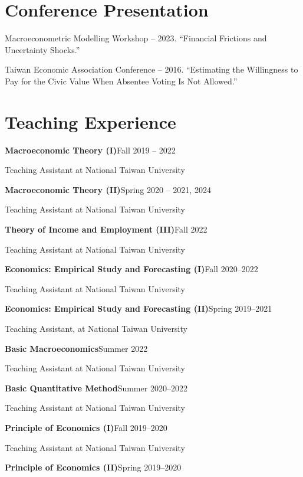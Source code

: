 \documentclass{article}
\newcommand{\cvsection}[1]{\section*{\rmfamily#1}}
\begin{document}
\cvsection{Conference Presentation}
\indent 

Macroeconometric Modelling Workshop -- 2023. “Financial Frictions and Uncertainty Shocks.”

Taiwan Economic Association Conference -- 2016. “Estimating the Willingness to Pay for the Civic Value When Absentee Voting Is Not Allowed.”



\cvsection{Teaching Experience}
\indent

\textbf{Macroeconomic Theory (I)}\hfill Fall 2019 -- 2022

\hspace{2em}Teaching Assistant at National Taiwan University

\textbf{Macroeconomic Theory (II)}\hfill Spring 2020 -- 2021, 2024

\hspace{2em}Teaching Assistant at National Taiwan University

\textbf{Theory of Income and Employment (III)}\hfill Fall 2022

\hspace{2em}Teaching Assistant at National Taiwan University

\textbf{Economics: Empirical Study and Forecasting (I)}\hfill Fall 2020--2022

\hspace{2em}Teaching Assistant at National Taiwan University

\textbf{Economics: Empirical Study and Forecasting (II)}\hfill Spring 2019--2021

\hspace{2em}Teaching Assistant, at National Taiwan University

\textbf{Basic Macroeconomics}\hfill Summer 2022

\hspace{2em}Teaching Assistant at National Taiwan University

\textbf{Basic Quantitative Method}\hfill Summer 2020--2022

\hspace{2em}Teaching Assistant at National Taiwan University

\textbf{Principle of Economics (I)}\hfill Fall 2019--2020

\hspace{2em}Teaching Assistant at National Taiwan University

\textbf{Principle of Economics (II)}\hfill Spring 2019--2020
\end{document}
